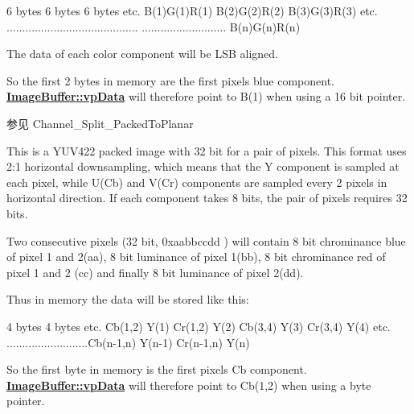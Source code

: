 \begin{Desc}
\begin{description}
\begin{DoxyCode}
6 bytes        6 bytes        6 bytes      etc.
B(1)G(1)R(1)   B(2)G(2)R(2)   B(3)G(3)R(3) etc.
..........................................
...........................   B(n)G(n)R(n)
\end{DoxyCode}


The data of each color component will be L\+S\+B aligned.

So the first 2 bytes in memory are the first pixels blue component. {\bfseries \hyperlink{struct_image_buffer_ab67c9c21d749e786302c848b508e0673}{Image\+Buffer\+::vp\+Data}} will therefore point to B(1) when using a 16 bit pointer.

\begin{DoxySeeAlso}{参见}
Channel\+\_\+\+Split\+\_\+\+Packed\+To\+Planar 
\end{DoxySeeAlso}
\item[{\em 
\hypertarget{group___common_interface_gga456e8aa76e06bb761f27c52141475985a8d85d61669e38ff8c55b6b959c6f66cb}{ibpf\+Y\+U\+V422\+\_\+\+U\+Y\+V\+Y\+Packed}\label{group___common_interface_gga456e8aa76e06bb761f27c52141475985a8d85d61669e38ff8c55b6b959c6f66cb}
}]This is a Y\+U\+V422 packed image with 32 bit for a pair of pixels. This format uses 2\+:1 horizontal downsampling, which means that the Y component is sampled at each pixel, while U(\+Cb) and V(\+Cr) components are sampled every 2 pixels in horizontal direction. If each component takes 8 bits, the pair of pixels requires 32 bits.

Two consecutive pixels (32 bit, 0xaabbccdd ) will contain 8 bit chrominance blue of pixel 1 and 2(aa), 8 bit luminance of pixel 1(bb), 8 bit chrominance red of pixel 1 and 2 (cc) and finally 8 bit luminance of pixel 2(dd).

Thus in memory the data will be stored like this\+:


\begin{DoxyCode}
4 bytes                   4 bytes                         etc.
Cb(1,2) Y(1) Cr(1,2) Y(2) Cb(3,4)   Y(3)   Cr(3,4)   Y(4)    etc.
..........................Cb(n-1,n) Y(n-1) Cr(n-1,n) Y(n)
\end{DoxyCode}


So the first byte in memory is the first pixels Cb component. {\bfseries \hyperlink{struct_image_buffer_ab67c9c21d749e786302c848b508e0673}{Image\+Buffer\+::vp\+Data}} will therefore point to Cb(1,2) when using a byte pointer.


\end{description}
\end{Desc}
